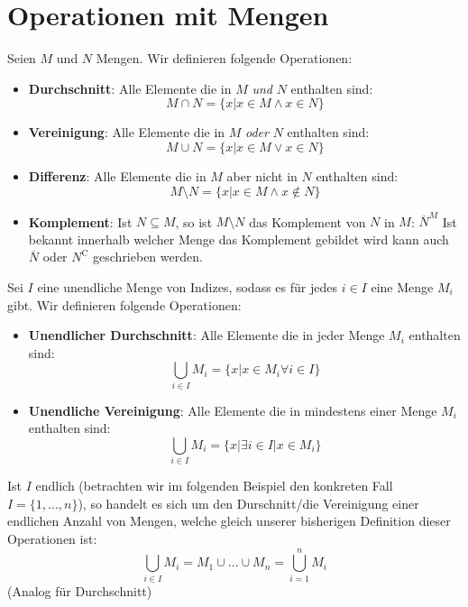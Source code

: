 \documentclass[../../main.tex]{subfiles}
\begin{document}
	
	
	\section{Operationen mit Mengen}

	\begin{definition}
		\label{def:Durchschnitt}
		Seien $M$ und $N$ Mengen. Wir definieren folgende Operationen: 
		\begin{itemize}
			\item \textbf{Durchschnitt}: Alle Elemente die in $M$ \textit{und} $N$ enthalten sind: $$M \cap N = \{x | x \in M \land x \in N\}$$
			\item \textbf{Vereinigung}: Alle Elemente die in $M$ \textit{oder} $N$ enthalten sind: $$M \cup N = \{x | x \in M \lor x \in N\}$$
			\item \textbf{Differenz}: Alle Elemente die in $M$ aber nicht in $N$ enthalten sind: $$M \setminus N = \{x | x \in M \land x \not \in N\}$$
			\item \textbf{Komplement}: Ist $N \subseteq M$, so ist $M \setminus N$ das Komplement von $N$ in $M$: $\overline{N}^M$ Ist bekannt innerhalb welcher Menge das Komplement gebildet wird kann auch $\overline{N}$ oder $N^\mathrm{C}$ geschrieben werden.
		\end{itemize}
	\end{definition}

	\begin{definition}
		Sei $I$ eine unendliche Menge von Indizes, sodass es für jedes $i \in I$ eine Menge $M_i$ gibt. Wir definieren folgende Operationen:
		\begin{itemize}
			\item \textbf{Unendlicher Durchschnitt}: Alle Elemente die in jeder Menge $M_i$ enthalten sind: $$\bigcup_{i \in I}M_i = \{x | x \in M_i \forall i \in I\}$$
			\item \textbf{Unendliche Vereinigung}: Alle Elemente die in mindestens einer Menge $M_i$ enthalten sind: $$\bigcup_{i \in I}M_i = \{x | \exists i \in I | x \in M_i\}$$
		\end{itemize}
		Ist $I$ endlich (betrachten wir im folgenden Beispiel den konkreten Fall $I=\{1,...,n\}$), so handelt es sich um den Durschnitt/die Vereinigung einer endlichen Anzahl von Mengen, welche gleich unserer bisherigen Definition dieser Operationen ist: $$\bigcup_{i \in I} M_i = M_1 \cup ... \cup M_n = \bigcup_{i = 1}^{n}M_i$$ (Analog für Durchschnitt)
	\end{definition}
\end{document}
